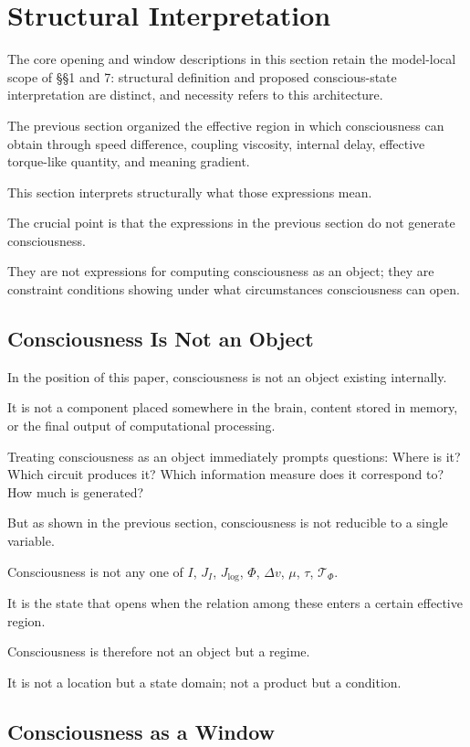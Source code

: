 \section{Structural Interpretation}

The core opening and window descriptions in this section retain the model-local scope of §§1 and 7: structural definition and proposed conscious-state interpretation are distinct, and necessity refers to this architecture.


The previous section organized the effective region in which consciousness can obtain through speed difference, coupling viscosity, internal delay, effective torque-like quantity, and meaning gradient.

This section interprets structurally what those expressions mean.

The crucial point is that the expressions in the previous section do not generate consciousness.

They are not expressions for computing consciousness as an object; they are constraint conditions showing under what circumstances consciousness can open.

\subsection{Consciousness Is Not an Object}


In the position of this paper, consciousness is not an object existing internally.

It is not a component placed somewhere in the brain, content stored in memory, or the final output of computational processing.

Treating consciousness as an object immediately prompts questions: Where is it? Which circuit produces it? Which information measure does it correspond to? How much is generated?

But as shown in the previous section, consciousness is not reducible to a single variable.

Consciousness is not any one of $I$, $J_I$, $J_{\log}$, $\Phi$, $\Delta v$, $\mu$, $\tau$, $\mathcal{T}_{\Phi}$.

It is the state that opens when the relation among these enters a certain effective region.

Consciousness is therefore not an object but a regime.

It is not a location but a state domain; not a product but a condition.

\subsection{Consciousness as a Window}


